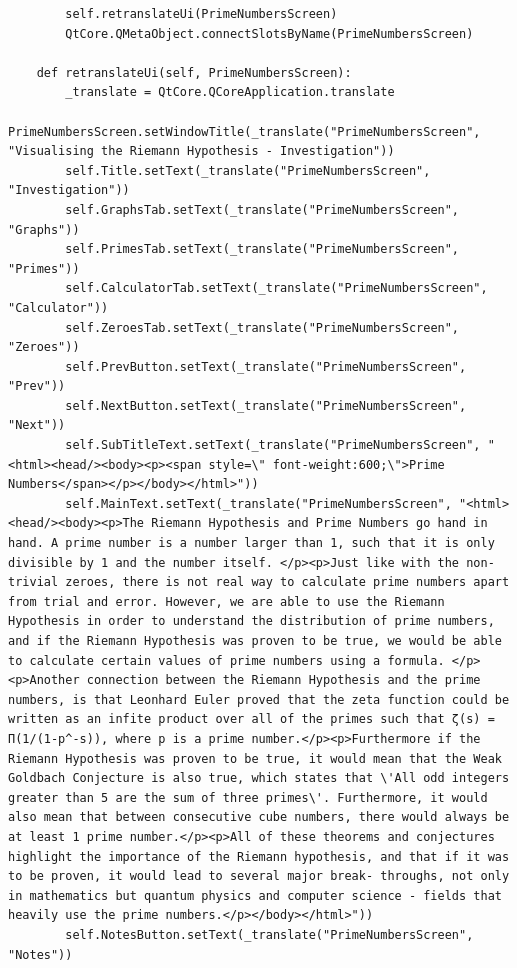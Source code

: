 \documentclass{article}
\begin{document}
\begin{lstlisting}
        self.retranslateUi(PrimeNumbersScreen)
        QtCore.QMetaObject.connectSlotsByName(PrimeNumbersScreen)

    def retranslateUi(self, PrimeNumbersScreen):
        _translate = QtCore.QCoreApplication.translate
        PrimeNumbersScreen.setWindowTitle(_translate("PrimeNumbersScreen", "Visualising the Riemann Hypothesis - Investigation"))
        self.Title.setText(_translate("PrimeNumbersScreen", "Investigation"))
        self.GraphsTab.setText(_translate("PrimeNumbersScreen", "Graphs"))
        self.PrimesTab.setText(_translate("PrimeNumbersScreen", "Primes"))
        self.CalculatorTab.setText(_translate("PrimeNumbersScreen", "Calculator"))
        self.ZeroesTab.setText(_translate("PrimeNumbersScreen", "Zeroes"))
        self.PrevButton.setText(_translate("PrimeNumbersScreen", "Prev"))
        self.NextButton.setText(_translate("PrimeNumbersScreen", "Next"))
        self.SubTitleText.setText(_translate("PrimeNumbersScreen", "<html><head/><body><p><span style=\" font-weight:600;\">Prime Numbers</span></p></body></html>"))
        self.MainText.setText(_translate("PrimeNumbersScreen", "<html><head/><body><p>The Riemann Hypothesis and Prime Numbers go hand in hand. A prime number is a number larger than 1, such that it is only divisible by 1 and the number itself. </p><p>Just like with the non-trivial zeroes, there is not real way to calculate prime numbers apart from trial and error. However, we are able to use the Riemann Hypothesis in order to understand the distribution of prime numbers, and if the Riemann Hypothesis was proven to be true, we would be able to calculate certain values of prime numbers using a formula. </p><p>Another connection between the Riemann Hypothesis and the prime numbers, is that Leonhard Euler proved that the zeta function could be written as an infite product over all of the primes such that ζ(s) = Π(1/(1-p^-s)), where p is a prime number.</p><p>Furthermore if the Riemann Hypothesis was proven to be true, it would mean that the Weak Goldbach Conjecture is also true, which states that \'All odd integers greater than 5 are the sum of three primes\'. Furthermore, it would also mean that between consecutive cube numbers, there would always be at least 1 prime number.</p><p>All of these theorems and conjectures highlight the importance of the Riemann hypothesis, and that if it was to be proven, it would lead to several major break- throughs, not only in mathematics but quantum physics and computer science - fields that heavily use the prime numbers.</p></body></html>"))
        self.NotesButton.setText(_translate("PrimeNumbersScreen", "Notes"))
\end{lstlisting}
\end{document}

